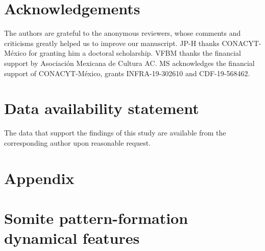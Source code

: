 \documentclass[%
 preprint,
 aip, 
 amsmath,amssymb,
]{revtex4-2}
\begin{document}
	
\section*{Acknowledgements}

The authors are grateful to the anonymous reviewers, whose comments and criticisms greatly helped us to improve our manuscript. JP-H thanks CONACYT-México for granting him a doctoral scholarship. VFBM thanks the financial support by Asociación Mexicana de Cultura AC. MS acknowledges the financial support of CONACYT-México, grants INFRA-19-302610 and CDF-19-568462. 

\section*{Data availability statement}


The data that support the findings of this study are available from the corresponding author upon reasonable request.
	
	
	\appendix
	
	\section*{Appendix}
	\section{Somite pattern-formation dynamical features}
	\label{app:bif}
\end{document}

